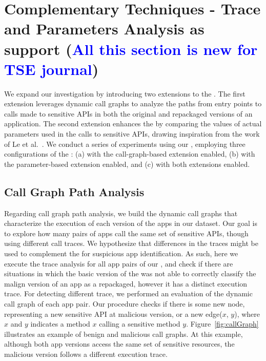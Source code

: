 \section{Complementary Techniques - Trace and Parameters Analysis as \mas support (\textcolor{blue}{All this section is new for TSE journal})}\label{sec:complementary}


We expand our investigation by introducing two extensions to the \mas. The first extension leverages dynamic call graphs
to analyze the paths from entry points to calls made to sensitive APIs in both the original and repackaged versions of an application.
The second extension enhances the \mas by comparing the values of actual parameters used in the calls to sensitive APIs,
drawing inspiration from the work of Le et al.~\cite{le2018towards}. We conduct a series of experiments using our \cds,
employing three configurations of the \mas: (a) with the call-graph-based extension enabled,
(b) with the parameter-based extension enabled, and (c) with both extensions enabled.

\subsection{Call Graph Path Analysis}


Regarding call graph path analysis, we build the dynamic call graphs that characterize the execution of each version of the apps in our dataset. Our goal is to explore how many pairs of apps call the same set of sensitive APIs, though using different call traces. We hypothesize that differences in the traces might be used to complement the \mas for suspicious app identification. As such, here we execute the trace analysis for all app pairs of our \cds, and check if there are situations in which the basic version of the \mas was not able to correctly classify the malign version of an app as a repackaged, however it has a distinct execution trace. For detecting different trace, we performed an evaluation of the dynamic call graph of each app pair. Our procedure checks if there is some new node, representing a new sensitive API at malicious version, or a new edge($x$, $y$), where $x$ and $y$ indicates a method $x$ calling a sensitive method $y$. Figure~\ref{fig:callGraph} illustrates an example of benign and malicious call graphs.
At this example, although both app versions access the same set of sensitive resources, the
malicious version follows a different execution trace.




